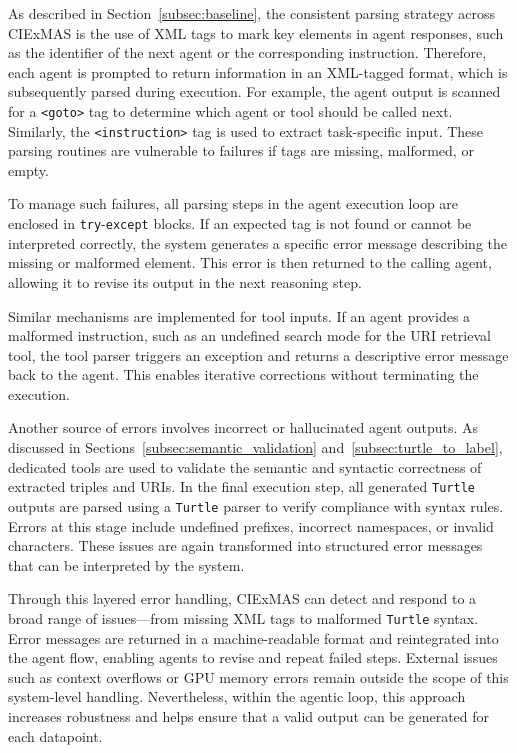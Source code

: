 \documentclass[a4paper,oneside,bibliography=totoc]{scrbook}
\begin{document}
As described in Section~\ref{subsec:baseline}, the consistent parsing strategy across CIExMAS is the use of XML tags to mark key elements in agent responses, such as the identifier of the next agent or the corresponding instruction. Therefore, each agent is prompted to return information in an XML-tagged format, which is subsequently parsed during execution. For example, the agent output is scanned for a \texttt{<goto>} tag to determine which agent or tool should be called next. Similarly, the \texttt{<instruction>} tag is used to extract task-specific input. These parsing routines are vulnerable to failures if tags are missing, malformed, or empty.

To manage such failures, all parsing steps in the agent execution loop are enclosed in \texttt{try}-\texttt{except} blocks. If an expected tag is not found or cannot be interpreted correctly, the system generates a specific error message describing the missing or malformed element. This error is then returned to the calling agent, allowing it to revise its output in the next reasoning step.

Similar mechanisms are implemented for tool inputs. If an agent provides a malformed instruction, such as an undefined search mode for the URI retrieval tool, the tool parser triggers an exception and returns a descriptive error message back to the agent. This enables iterative corrections without terminating the execution.

Another source of errors involves incorrect or hallucinated agent outputs. As discussed in Sections~\ref{subsec:semantic_validation} and~\ref{subsec:turtle_to_label}, dedicated tools are used to validate the semantic and syntactic correctness of extracted triples and URIs. In the final execution step, all generated \texttt{Turtle} outputs are parsed using a \texttt{Turtle} parser to verify compliance with syntax rules. Errors at this stage include undefined prefixes, incorrect namespaces, or invalid characters. These issues are again transformed into structured error messages that can be interpreted by the system.

Through this layered error handling, CIExMAS can detect and respond to a broad range of issues—from missing XML tags to malformed \texttt{Turtle} syntax. Error messages are returned in a machine-readable format and reintegrated into the agent flow, enabling agents to revise and repeat failed steps. External issues such as context overflows or GPU memory errors remain outside the scope of this system-level handling. Nevertheless, within the agentic loop, this approach increases robustness and helps ensure that a valid output can be generated for each datapoint.
\end{document}

